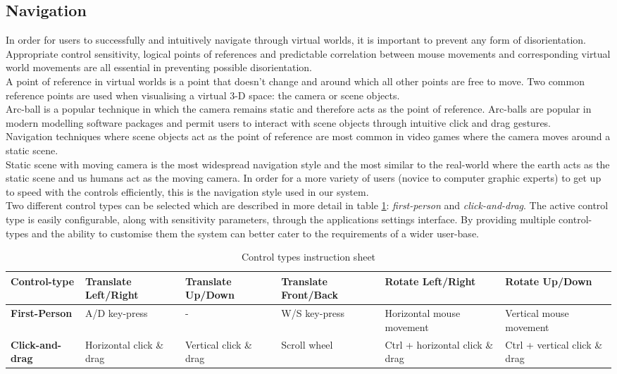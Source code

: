 \subsection{Navigation}

In order for users to successfully and intuitively navigate through virtual worlds, it is important to prevent any form of disorientation. Appropriate control sensitivity, logical points of references and predictable correlation between mouse movements and corresponding virtual world movements are all essential in preventing possible disorientation.\\
A point of reference in virtual worlds is a point that doesn't change and around which all other points are free to move. Two common reference points are used when visualising a virtual 3-D space: the camera or scene objects.\\
Arc-ball is a popular technique in which the camera remains static and therefore acts as the point of reference. Arc-balls are popular in modern modelling software packages and permit users to interact with scene objects through intuitive click and drag gestures.\\
Navigation techniques where scene objects act as the point of reference are most common in video games where the camera moves around a static scene. \\
Static scene with moving camera is the most widespread navigation style and the most similar to the real-world where the earth acts as the static scene and us humans act as the moving camera. In order for a more variety of users (novice to computer graphic experts) to get up to speed with the controls efficiently, this is the navigation style used in our system.\\

Two different control types can be selected which are described in more detail in table \ref{tab:control_types}: \textit{first-person} and \textit{click-and-drag}. The active control type is easily configurable, along with sensitivity parameters, through the applications settings interface. By providing multiple control-types and the ability to customise them the system can better cater to the requirements of a wider user-base.

\begin{table}[h]
  \centering
	    \begin{tabular}{|p{3cm}|p{2.5cm}|p{2.5cm}|p{2.5cm}|p{2.5cm}|p{2.5cm}|}
  	    \hline	
  	    \textbf{Control-type} & \textbf{Translate Left/Right} & \textbf{Translate Up/Down} & \textbf{Translate Front/Back} & \textbf{Rotate Left/Right} & \textbf{Rotate Up/Down} \\
		\hline
		\textbf{First-Person} & A/D key-press & - & W/S key-press & Horizontal mouse movement & Vertical mouse movement \\
		\hline
		\textbf{Click-and-drag} & Horizontal click \& drag & Vertical click \& drag & Scroll wheel & Ctrl + horizontal click \& drag & Ctrl + vertical click \& drag\\
		\hline
		\end{tabular}
		\caption{Control types instruction sheet}
	  \label{tab:control_types}
\end{table}

